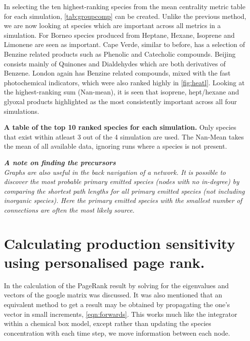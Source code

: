In selecting the ten highest-ranking species from the mean centrality metric table for each simulation, \autoref{tab:groupcomp} can be created. Unlike the previous method, we are now looking at species which are important across all metrics in a simulation. For Borneo species produced from Heptane, Hexane, Isoprene and Limonene are seen as important. Cape Verde, similar to before, has a selection of Benzine related products such as Phenolic and Catecholic compounds. Beijing consists mainly of Quinones and Dialdehydes which are both derivatives of Benzene. London again has Benzine related compounds, mixed with the fast photochemical indicators, which were also ranked highly in \autoref{fig:heatl}. Looking at the highest-ranking sum (Nan-mean), it is seen that isoprene, hept/hexane and glyoxal products highlighted as the most consistently important across all four simulations. 

\begin{table}[H]
\centering
\small

\caption{\textbf{A table of the top 10 ranked species for each simulation.} Only species that exist within atleast 3 out of the 4 simulation are used. The Nan-Mean takes the mean of all available data, ignoring runs where a species is not present.}
\label{tab:groupcomp}
\end{table} 



\textit{\textbf{A note on finding the precursors}\\ Graphs are also useful in the back navigation of a network. It is possible to discover the most probable primary emitted species (nodes with no in-degree) by comparing the shortest path lengths for all primary emitted species (not including inorganic species). Here the primary emitted species with the smallest number of connections are often the most likely source.}




\section{Calculating production sensitivity using personalised page rank.}

In \label{sec:pagerank} the calculation of the PageRank result by solving for the eigenvalues and vectors of the google matrix was discussed. It was also mentioned that an equivalent method to get a result may be obtained by propagating the one's vector in small increments, \autoref{eqn:forwards}. This works much like the integrator within a chemical box model, except rather than updating the species concentration with each time step, we move information between each node. 

